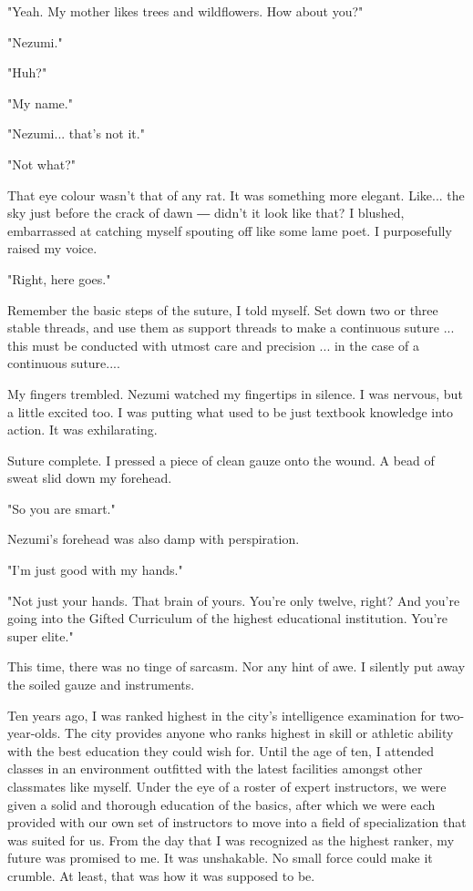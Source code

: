 "Yeah. My mother likes trees and wildflowers. How about you?"

"Nezumi."

"Huh?"

"My name."

"Nezumi... that's not it."

"Not what?"

That eye colour wasn't that of any rat. It was something more elegant.
Like... the sky just before the crack of dawn ― didn't it look like
that? I blushed, embarrassed at catching myself spouting off like some
lame poet. I purposefully raised my voice.

"Right, here goes."

Remember the basic steps of the suture, I told myself. Set down two or
three stable threads, and use them as support threads to make a
continuous suture ... this must be conducted with utmost care and
precision ... in the case of a continuous suture....

My fingers trembled. Nezumi watched my fingertips in silence. I was
nervous, but a little excited too. I was putting what used to be just
textbook knowledge into action. It was exhilarating.

Suture complete. I pressed a piece of clean gauze onto the wound. A bead
of sweat slid down my forehead.

"So you are smart."

Nezumi's forehead was also damp with perspiration.

"I'm just good with my hands."

"Not just your hands. That brain of yours. You're only twelve, right?
And you're going into the Gifted Curriculum of the highest educational
institution. You're super elite."

This time, there was no tinge of sarcasm. Nor any hint of awe. I
silently put away the soiled gauze and instruments.~

Ten years ago, I was ranked highest in the city's intelligence
examination for two-year-olds. The city provides anyone who ranks
highest in skill or athletic ability with the best education they could
wish for. Until the age of ten, I attended classes in an environment
outfitted with the latest facilities amongst other classmates like
myself. Under the eye of a roster of expert instructors, we were given a
solid and thorough education of the basics, after which we were each
provided with our own set of instructors to move into a field of
specialization that was suited for us. From the day that I was
recognized as the highest ranker, my future was promised to me. It was
unshakable. No small force could make it crumble. At least, that was how
it was supposed to be.

